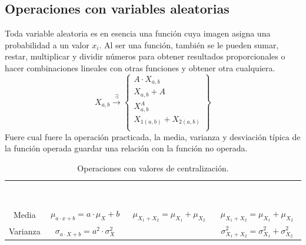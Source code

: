 \subsection{Operaciones con variables aleatorias}
Toda variable aleatoria es en esencia una función cuya imagen asigna una probabilidad a un valor $x_i$. Al ser una función, también se le pueden sumar, restar, multiplicar y dividir números para obtener resultados proporcionales o hacer combinaciones lineales con otras funciones y obtener otra cualquiera.
\begin{equation*}
    X_{a,b}\xrightarrow{\exists}\left\lbrace \begin{array}{c}
        A\cdot X_{a,b}\\
        X_{a,b} + A\\
        X_{a,b}^A\\
        X_{1\left( a,b\right) } + X_{2\left( a,b\right) }\\
    \end{array}\right\rbrace 
\end{equation*}
Fuere cual fuere la operación practicada, la media, varianza y desviación típica de la función operada guardar una relación con la función no operada.
\begin{table}[H]
    \begin{tabular}{cccc}
        \rowcolor{black}&\textcolor{white}{$a,b$ números cualesquiera}&\textcolor{white}{$X_1,X_2$ variables dependientes}&\textcolor{white}{$X_1,X_2$ variables independientes}\\
        Media &$\mu_{a\cdot x+b} = a\cdot \mu_X + b$&$\mu_{X_1 + X_2} = \mu_{X_1} + \mu_{X_2}$&$\mu_{X_1 + X_2} = \mu_{X_1} + \mu_{X_2}$\\
        \rowcolor{hiperlightgray}Varianza &$\sigma_{a\cdot X + b} = a^2\cdot\sigma_X^2$&&$\sigma_{X_1 + X_2}^2 = \sigma_{X_1}^2 + \sigma_{X_2}^2$\\
        \hline
    \end{tabular}
    \caption[Operaciones con valores de centralización]{Operaciones con valores de centralización.}
\end{table}